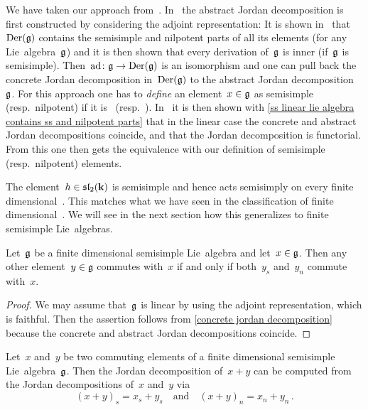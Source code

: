\begin{remark}
  We have taken our approach from~\cite[I.\S6.3]{bourbaki_lie}.
  In~\cite{humphreys} the abstract Jordan decomposition is first constructed by considering the adjoint representation:
  It is shown in~\cite[\S 4.2, \S 5.3]{humphreys} that~$\operatorname{Der}(\mathfrak{g})$ contains the semisimple and nilpotent parts of all its elements (for any Lie~algebra~$\mathfrak{g}$) and it is then shown that every derivation of~$\mathfrak{g}$ is inner (if~$\mathfrak{g}$ is semisimple).
  Then~$\operatorname{ad} \colon \mathfrak{g} \to \operatorname{Der}(\mathfrak{g})$ is an isomorphism and one can pull back the concrete Jordan decomposition in~$\operatorname{Der}(\mathfrak{g})$ to the abstract Jordan decomposition~$\mathfrak{g}$.
  For this approach one has to \emph{define} an element~$x \in \mathfrak{g}$ as semisimple (resp.\ nilpotent) if it is~{\adsemisimple} (resp.\ {\adnilpotent}).
  In~\cite[\S 6]{humphreys} it is then shown with \cref{ss linear lie algebra contains ss and nilpotent parts} that in the linear case the concrete and abstract Jordan decompositions coincide, and that the Jordan decomposition is functorial.
  From this one then gets the equivalence with our definition of semisimple (resp.\ nilpotent) elements.
\end{remark}


\begin{example}
  The element~$h \in \mathfrak{sl}_2(\mathbf{k})$ is semisimple and hence acts semisimply on every finite dimensional~{}.
  This matches what we have seen in the classification of finite dimensional~{}.
  We will see in the next section how this generalizes to finite semisimple Lie~algebras.
\end{example}


\begin{lemma}
  \label{commuting via abstract jd}
  Let~$\mathfrak{g}$ be a finite dimensional semisimple Lie~algebra and let~$x \in \mathfrak{g}$.
  Then any other element~$y \in \mathfrak{g}$ commutes with~$x$ if and only if both~$y_s$ and~$y_n$ commute with~$x$.
\end{lemma}


\begin{proof}
  We may assume that~$\mathfrak{g}$ is linear by using the adjoint representation, which is faithful.
  Then the assertion follows from \cref{concrete jordan decomposition} because the concrete and abstract Jordan decompositions coincide.
\end{proof}


\begin{lemma}
  \label{abstract jordan decomposition of sum}
    Let~$x$ and~$y$ be two commuting elements of a finite dimensional semisimple Lie~algebra~$\mathfrak{g}$.
    Then the Jordan decomposition of~$x+y$ can be computed from the Jordan decompositions of~$x$ and~$y$ via
    \[
      (x + y)_s
      =
      x_s + y_s
      \quad\text{and}\quad
      (x + y)_n
      =
      x_n + y_n \,.
    \]
\end{lemma}


